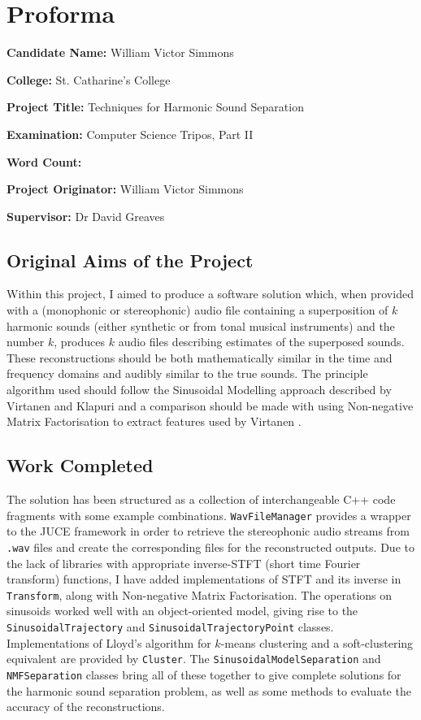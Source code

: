 \documentclass[10pt,twoside,a4paper]{report}
\begin{document}

\chapter*{Proforma}

\textbf{Candidate Name:} William Victor Simmons

\textbf{College:} St. Catharine's College

\textbf{Project Title:} Techniques for Harmonic Sound Separation

\textbf{Examination:} Computer Science Tripos, Part II

\textbf{Word Count:}

\textbf{Project Originator:} William Victor Simmons

\textbf{Supervisor:} Dr David Greaves

\section*{Original Aims of the Project}

Within this project, I aimed to produce a software solution which, when provided with a (monophonic or stereophonic) audio file containing a superposition of $ k $ harmonic sounds (either synthetic or from tonal musical instruments) and the number $ k $, produces $ k $ audio files describing estimates of the superposed sounds. These reconstructions should be both mathematically similar in the time and frequency domains and audibly similar to the true sounds. The principle algorithm used should follow the Sinusoidal Modelling approach described by Virtanen and Klapuri \cite{virtanen2000separation} and a comparison should be made with using Non-negative Matrix Factorisation to extract features used by Virtanen \cite{virtanen2003sound}.

\section*{Work Completed}

The solution has been structured as a collection of interchangeable C++ code fragments with some example combinations. \texttt{WavFileManager} provides a wrapper to the JUCE \cite{juce} framework in order to retrieve the stereophonic audio streams from \texttt{.wav} files and create the corresponding files for the reconstructed outputs. Due to the lack of libraries with appropriate inverse-STFT (short time Fourier transform) functions, I have added implementations of STFT and its inverse in \texttt{Transform}, along with Non-negative Matrix Factorisation. The operations on sinusoids worked well with an object-oriented model, giving rise to the \texttt{SinusoidalTrajectory} and \texttt{SinusoidalTrajectoryPoint} classes. Implementations of Lloyd's algorithm for $ k $-means clustering and a soft-clustering equivalent are provided by \texttt{Cluster}. The \texttt{SinusoidalModelSeparation} and \texttt{NMFSeparation} classes bring all of these together to give complete solutions for the harmonic sound separation problem, as well as some methods to evaluate the accuracy of the reconstructions.
\end{document}

